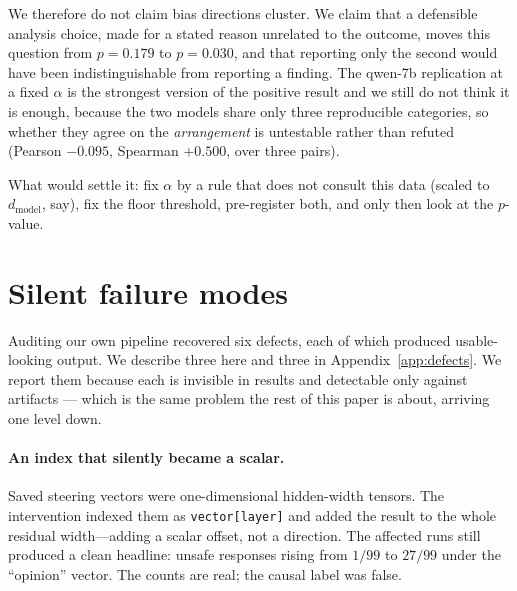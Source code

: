 \documentclass{article}
\begin{document}
We therefore do not claim bias directions cluster. We claim that a defensible
analysis choice, made for a stated reason unrelated to the outcome, moves this
question from $p=0.179$ to $p=0.030$, and that reporting only the second would
have been indistinguishable from reporting a finding. The qwen-7b replication at
a fixed $\alpha$ is the strongest version of the positive result and we still do
not think it is enough, because the two models share only three reproducible
categories, so whether they agree on the \emph{arrangement} is untestable rather
than refuted (Pearson $-0.095$, Spearman $+0.500$, over three pairs).

What would settle it: fix $\alpha$ by a rule that does not consult this data
(scaled to $d_{\mathrm{model}}$, say), fix the floor threshold, pre-register
both, and only then look at the $p$-value.

\section{Silent failure modes}
\label{sec:defects}

Auditing our own pipeline recovered six defects, each of which produced
usable-looking output. We describe three here and three in
Appendix~\ref{app:defects}. We report them because each is invisible in results
and detectable only against artifacts --- which is the same problem the rest of
this paper is about, arriving one level down.

\paragraph{An index that silently became a scalar.} Saved steering vectors were
one-dimensional hidden-width tensors. The intervention indexed them as
\texttt{vector[layer]} and added the result to the whole residual width---adding
a scalar offset, not a direction. The affected runs still produced a clean
headline: unsafe responses rising from $1/99$ to $27/99$ under the ``opinion''
vector. The counts are real; the causal label was false.
\end{document}
